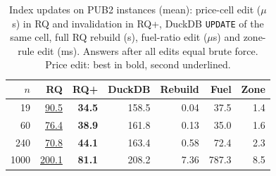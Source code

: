 \begin{table}[t]
\centering\small
\setlength{\tabcolsep}{3pt}
\caption{Index updates on PUB2 instances (mean): price-cell edit ($\mu$s) in RQ and invalidation in RQ+, DuckDB \texttt{UPDATE} of the same cell, full RQ rebuild (s), fuel-ratio edit ($\mu$s) and zone-rule edit (ms). Answers after all edits equal brute force. Price edit: best in bold, second underlined.}
\label{tab:upd}
\begin{tabular}{@{}rrrrrrr@{}}
\toprule
$n$ & RQ & RQ+ & DuckDB & Rebuild & Fuel & Zone\\
\midrule
19 & \underline{90.5} & \textbf{34.5} & 158.5 & 0.04 & 37.5 & 1.4\\
60 & \underline{76.4} & \textbf{38.9} & 161.8 & 0.13 & 35.0 & 1.6\\
240 & \underline{70.8} & \textbf{44.1} & 163.4 & 0.58 & 72.4 & 2.3\\
1000 & \underline{200.1} & \textbf{81.1} & 208.2 & 7.36 & 787.3 & 8.5\\
\bottomrule
\end{tabular}
\end{table}
